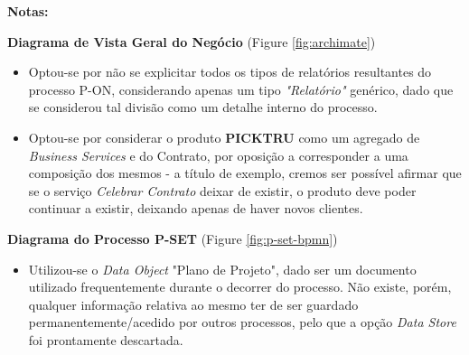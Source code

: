 \documentclass[12pt,a4paper]{article}
\begin{document}
\begin{tcolorbox}[enhanced jigsaw,colback=bg,boxrule=0pt,arc=4pt]
  \begin{large}
    \textbf{Notas:}
  \end{large}

  \begin{small}
    \textbf{Diagrama de Vista Geral do Negócio} (Figure \ref{fig:archimate})
  \end{small}
  \begin{itemize}
    \item Optou-se por não se explicitar todos os tipos de relatórios resultantes do processo P-ON,
          considerando apenas um tipo \textit{"Relatório"} genérico, dado que se considerou tal
          divisão como um detalhe interno do processo.
    \item Optou-se por considerar o produto \textbf{PICKTRU} como um agregado de
          \textit{Business Services} e do Contrato, por oposição a corresponder a uma
          composição dos mesmos - a título de exemplo, cremos ser possível afirmar que
          se o serviço \textit{Celebrar Contrato} deixar de existir, o produto deve poder
          continuar a existir, deixando apenas de haver novos clientes.
  \end{itemize}

  \begin{small}
    \textbf{Diagrama do Processo P-SET} (Figure \ref{fig:p-set-bpmn})
  \end{small}
  \begin{itemize}
    \item Utilizou-se o \textit{Data Object} "Plano de Projeto", dado ser um documento
          utilizado frequentemente durante o decorrer do processo.
          Não existe, porém, qualquer informação relativa ao mesmo ter de ser guardado permanentemente/acedido
          por outros processos, pelo que a opção \textit{Data Store} foi prontamente descartada.
  \end{itemize}


\end{tcolorbox}
\end{document}
